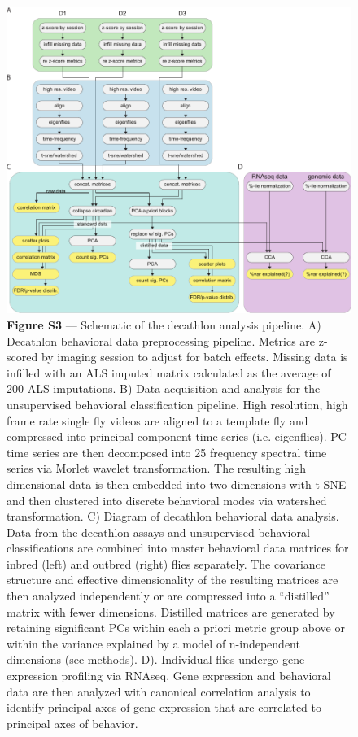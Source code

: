 \documentclass[12pt,letterpaper]{article}
\begin{document}
\begin{figure}[t!]
    \includegraphics[width=\textwidth]{../figures/chapter_3/fig_s3.pdf}
    \caption*{\textbf{Figure S3} — Schematic of the decathlon analysis pipeline. A) Decathlon behavioral data preprocessing pipeline. Metrics are z-scored by imaging session to adjust for batch effects. Missing data is infilled with an ALS imputed matrix calculated as the average of 200 ALS imputations. B) Data acquisition and analysis for the unsupervised behavioral classification pipeline. High resolution, high frame rate single fly videos are aligned to a template fly and compressed into principal component time series (i.e. eigenflies). PC time series are then decomposed into 25 frequency spectral time series via Morlet wavelet transformation. The resulting high dimensional data is then embedded into two dimensions with t-SNE and then clustered into discrete behavioral modes via watershed transformation. C) Diagram of decathlon behavioral data analysis. Data from the decathlon assays and unsupervised behavioral classifications are combined into master behavioral data matrices for inbred (left) and outbred (right) flies separately. The covariance structure and effective dimensionality of the resulting matrices are then analyzed independently or are compressed into a “distilled” matrix with fewer dimensions. Distilled matrices are generated by retaining significant PCs within each a priori metric group above or within the variance explained by a model of n-independent dimensions (see methods). D). Individual flies undergo gene expression profiling via RNAseq. Gene expression and behavioral data are then analyzed with canonical correlation analysis to identify principal axes of gene expression that are correlated to principal axes of behavior.}
\end{figure}
\clearpage
\end{document}
